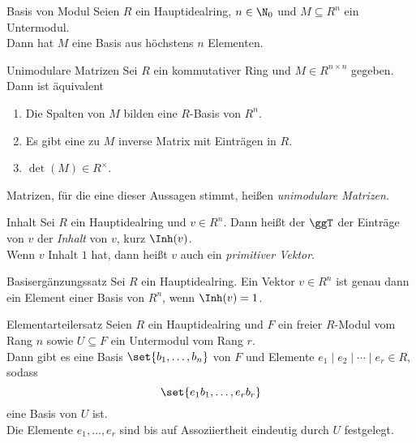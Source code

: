 \begin{karte}{Basis von Modul}
    Seien \(R\) ein Hauptidealring, \(n\in \N_0\) und 
    \(M\subseteq R^n\) ein Untermodul. \\
    Dann hat \(M\) eine Basis aus höchstens \(n\) Elementen. 
\end{karte}

\begin{karte}{Unimodulare Matrizen}
    Sei \(R\) ein kommutativer Ring und \(M \in R^{n\times n}\) gegeben. 
    Dann ist äquivalent
    \begin{enumerate}
        \item Die Spalten von \(M\) bilden eine \(R\)-Basis von \(R^n\).
        \item Es gibt eine zu \(M\) inverse Matrix mit Einträgen in \(R\).
        \item \(\det(M) \in R^\times\).
    \end{enumerate}
    Matrizen, für die eine dieser Aussagen stimmt, heißen \textit{unimodulare Matrizen}.
\end{karte}

\begin{karte}{Inhalt}
    Sei \(R\) ein Hauptidealring und \(v\in R^n\). Dann heißt der \(\ggT\)
    der Einträge von \(v\) der \textit{Inhalt} von \(v\), kurz \(\Inh(v)\).\\
    Wenn \(v\) Inhalt \(1\) hat, dann heißt \(v\) auch ein \textit{primitiver Vektor}.
\end{karte}

\begin{karte}{Basisergänzungssatz}
    Sei \(R\) ein Hauptidealring. Ein Vektor \(v\in R^n\) ist genau dann 
    ein Element einer Basis von \(R^n\), wenn \(\Inh(v) = 1\).
\end{karte}

\begin{karte}{Elementarteilersatz}
    Seien \(R\) ein Hauptidealring und \(F\) ein freier \(R\)-Modul 
    vom Rang \(n\) sowie \(U \subseteq F\) ein Untermodul vom Rang \(r\).\\
    Dann gibt es eine Basis \(\set{ b_1, \ldots, b_n }\) von \(F\) und 
    Elemente \( e_1 \;|\; e_2 \;|\; \cdots \;|\; e_r \in R \), 
    sodass 
    \[ \set{ e_1 b_1, \ldots, e_r b_r } \] 
    eine Basis von \(U\) ist.\\
    Die Elemente \(e_1, \ldots, e_r\) sind bis auf Assoziiertheit 
    eindeutig durch \(U\) festgelegt. 
\end{karte}

